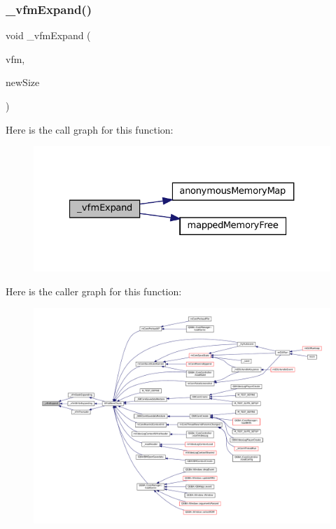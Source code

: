 \subsubsection{\texorpdfstring{\+\_\+vfm\+Expand()}{\_vfmExpand()}}
{\footnotesize\ttfamily void \+\_\+vfm\+Expand (\begin{DoxyParamCaption}\item[{struct V\+File\+Mem $\ast$}]{vfm,  }\item[{size\+\_\+t}]{new\+Size }\end{DoxyParamCaption})}

Here is the call graph for this function\+:
\nopagebreak
\begin{figure}[H]
\begin{center}
\leavevmode
\includegraphics[width=327pt]{vfs-mem_8c_afb9f6199d8108a580de61d7ddc4a1b9b_cgraph}
\end{center}
\end{figure}
Here is the caller graph for this function\+:
\nopagebreak
\begin{figure}[H]
\begin{center}
\leavevmode
\includegraphics[width=350pt]{vfs-mem_8c_afb9f6199d8108a580de61d7ddc4a1b9b_icgraph}
\end{center}
\end{figure}
\mbox{\label{vfs-mem_8c_a0e3ab05b9cdddc0a3e3881c2e5fd8ebd}} 
